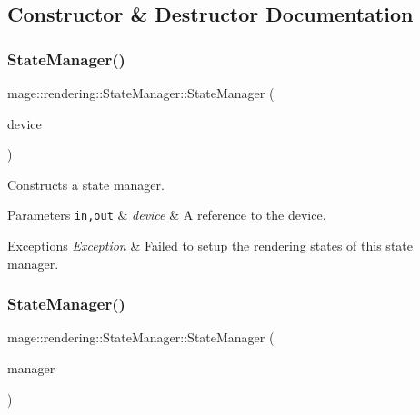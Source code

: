 \subsection{Constructor \& Destructor Documentation}
\mbox{\label{classmage_1_1rendering_1_1_state_manager_ae19649b2bfc0fc7eb3110fb85cda26b7}} 
\subsubsection{\texorpdfstring{State\+Manager()}{StateManager()}\hspace{0.1cm}{\footnotesize\ttfamily [1/3]}}
{\footnotesize\ttfamily mage\+::rendering\+::\+State\+Manager\+::\+State\+Manager (\begin{DoxyParamCaption}\item[{I\+D3\+D11\+Device \&}]{device }\end{DoxyParamCaption})\hspace{0.3cm}{\ttfamily [explicit]}}

Constructs a state manager.


\begin{DoxyParams}[1]{Parameters}
\mbox{\tt in,out}  & {\em device} & A reference to the device. \\
\hline
\end{DoxyParams}

\begin{DoxyExceptions}{Exceptions}
{\em \mbox{\hyperlink{classmage_1_1_exception}{Exception}}} & Failed to setup the rendering states of this state manager. \\
\hline
\end{DoxyExceptions}
\mbox{\label{classmage_1_1rendering_1_1_state_manager_aa5e404cde4e010a5738815d1d4938585}} 
\subsubsection{\texorpdfstring{State\+Manager()}{StateManager()}\hspace{0.1cm}{\footnotesize\ttfamily [2/3]}}
{\footnotesize\ttfamily mage\+::rendering\+::\+State\+Manager\+::\+State\+Manager (\begin{DoxyParamCaption}\item[{const \mbox{\hyperlink{classmage_1_1rendering_1_1_state_manager}{State\+Manager}} \&}]{manager }\end{DoxyParamCaption})\hspace{0.3cm}{\ttfamily [delete]}}

